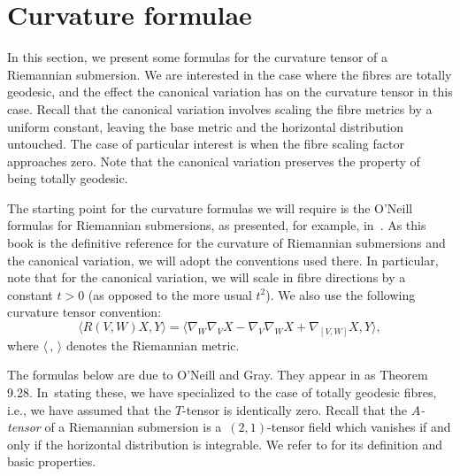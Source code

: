 \section{Curvature formulae}\label{formulas}

In this section, we present some formulas for the curvature tensor of a Riemannian submersion. We are interested in the case where the fibres are totally geodesic, and the effect the canonical variation has on the curvature tensor in this case. Recall that the canonical variation involves scaling the fibre metrics by a uniform constant, leaving the base metric and the horizontal distribution untouched. The case of particular interest is when the fibre scaling factor approaches zero. Note that the canonical variation preserves the property of being totally geodesic.

The starting point for the curvature formulas we will require is the O'Neill formulas for Riemannian submersions, as presented, for example, in~\cite{Be}. As this book is the definitive reference for the curvature of Riemannian submersions and the canonical variation, we will adopt the conventions used there. In particular, note that for the canonical variation, we will scale in fibre directions by a constant $t>0$ \big(as opposed to the more usual $t^2$\big). We also use the following curvature tensor convention:
\[
\langle R(V,W)X,Y\rangle=\bigl\langle \nabla_W\nabla_V X -\nabla_V \nabla_W X+\nabla_{[V,W]}X,Y\bigr\rangle,
\]
where $\langle\,,\,\rangle$ denotes the Riemannian metric.

The formulas below are due to O'Neill and Gray. They appear in \cite{Be} as Theorem 9.28. In~stating these, we have specialized to the case of totally geodesic fibres, i.e., we have assumed that the $T$-tensor is identically zero. Recall that the \emph{$A$-tensor} of a Riemannian submersion is a~$(2,1)$-tensor field which vanishes if and only if the horizontal distribution is integrable. We refer to \cite[Section 9.C]{Be} for its definition and basic properties.

